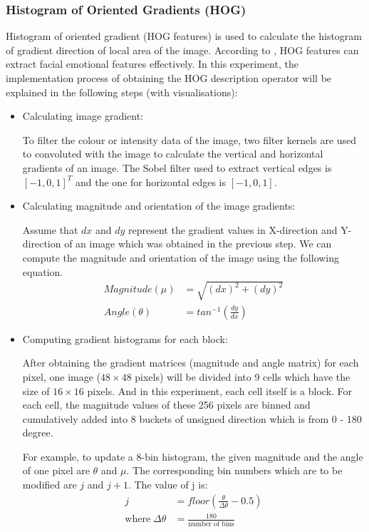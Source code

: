 \documentclass{article}
\begin{document}
\subsubsection{Histogram of Oriented Gradients (HOG)}
Histogram of oriented gradient (HOG features) is used to calculate the histogram of gradient direction of local area of the image. According to \cite{Dalal2005HistogramsOO}, HOG features can extract facial emotional features effectively. In this experiment, the implementation process of obtaining the HOG description operator will be explained in the following steps (with visualisations): 
\begin{itemize}
\item Calculating image gradient:  

To filter the colour or intensity data of the image, two filter kernels are used to convoluted with the image to calculate the vertical and horizontal gradients of an image. The Sobel filter used to extract vertical edges is $[-1,0,1]^T$ and the one for horizontal edges is $[-1,0,1]$. 

\item Calculating magnitude and orientation of the image gradients: 

Assume that $dx$ and $dy$ represent the gradient values in X-direction and Y-direction of an image which was obtained in the previous step. We can compute the magnitude and orientation of the image using the following equation.
\begin{align*}
Magnitude(\mu) & = \sqrt{(dx)^2+(dy)^2}\\
Angle(\theta) & =  tan^{-1}(\frac{dy}{dx})
\end{align*}

\item Computing gradient histograms for each block:

After obtaining the gradient matrices (magnitude and angle matrix) for each pixel, one image ($48\times48$ pixels) will be divided into 9 cells which have the size of $16\times16$ pixels. And in this experiment, each cell itself is a block. For each cell, the magnitude values of these 256 pixels are binned and cumulatively added into 8 buckets of unsigned direction which is from 0 - 180 degree.

For example, to update a 8-bin histogram, the given magnitude and the angle of one pixel are $\theta$ and $\mu$.  The corresponding bin numbers which are to be modified are $j$ and $j+1$. The value of j is:
\begin{align*}
j & = floor(\frac{\theta}{\Delta \theta}-0.5)\\
\text{where} \; \Delta \theta &= \frac{180}{\text{number of bins}}
\end{align*}


\end{itemize}
\end{document}
